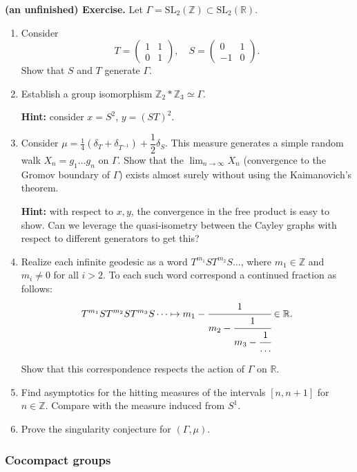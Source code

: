 \documentclass[11pt]{amsart}
\theoremstyle{definition}
\begin{document}
	\textbf{(an unfinished) Exercise.} Let $\Gamma = \text{SL}_2(\mathbb{Z}) \subset \text{SL}_2(\mathbb{R})$. 
	\begin{enumerate}
		\item Consider 
		\[
		T = \begin{pmatrix} 1 & 1 \\ 0 & 1 \end{pmatrix}, \quad S = \begin{pmatrix} 0 & 1 \\ -1 & 0 \end{pmatrix}.
		\]
		Show that $S$ and $T$ generate $\Gamma$.
		\item Establish a group isomorphism $\mathbb{Z}_2 * \mathbb{Z}_3 \simeq \Gamma$.
		
		\textbf{Hint:} consider $x = S^2$, $y = (ST)^2$. 
		\item Consider $\mu = \frac{1}{4} (\delta_T + \delta_{T^{-1}}) + \dfrac{1}{2} \delta_S$. This measure generates a simple random walk $X_n = g_1 \dots g_n$ on $\Gamma$. Show that the $\lim_{n \rightarrow \infty} X_n$ (convergence to the Gromov boundary of $\Gamma$) exists almost surely without using the Kaimanovich's theorem.
		
		\textbf{Hint:} with respect to $x, y$, the convergence in the free product is easy to show. Can we leverage the quasi-isometry between the Cayley graphs with respect to different generators to get this? 
		\item Realize each infinite geodesic as a word $T^{m_1} S T^{m_2} S \dots$, where $m_1 \in \mathbb{Z}$ and $m_i \ne 0$ for all $i > 2$. To each such word correspond a continued fraction as follows:
		\[
		T^{m_1} S T^{m_2} S T^{m_3} S \dots \mapsto m_1 - \cfrac{1}{m_2 - \cfrac{1}{m_3 - \cfrac{1}{\dots}}} \in \mathbb{R}.
		\]
		
		Show that this correspondence respects the action of $\Gamma$ on $\mathbb{R}$.
		
		\item Find asymptotics for the hitting measures of the intervals $[n, n+1]$ for $n \in \mathbb{Z}$. Compare with the measure induced from $S^1$.
		\item Prove the singularity conjecture for $(\Gamma, \mu)$.
	\end{enumerate}
	
	\subsubsection{Cocompact groups} 
	
\end{document}
